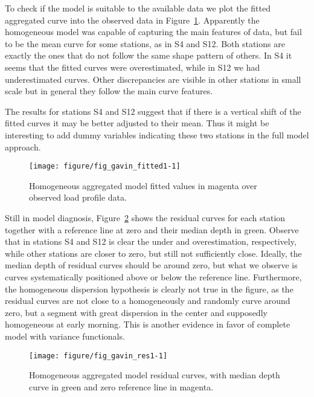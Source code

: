 To check if the model is suitable to the available data we plot the fitted aggregated curve into the observed data in Figure~\ref{fig:gavin-fitted1}. Apparently the homogeneous model was capable of capturing the main features of data, but fail to be the mean curve for some stations, as in S4 and S12. Both stations are exactly the ones that do not follow the same shape pattern of others. In S4 it seems that the fitted curves were overestimated, while in S12 we had underestimated curves. Other discrepancies are visible in other stations in small scale but in general they follow the main curve features.

The results for stations S4 and S12 suggest that if there is a vertical shift of the fitted curves it may be better adjusted to their mean. Thus it might be interesting to add dummy variables indicating these two stations in the full model approach. 



\begin{figure}[t!]
  \centering
\begin{knitrout}
\color{fgcolor}
\texttt{[image: figure/fig\_gavin\_fitted1-1]} 

\end{knitrout}
  \caption{Homogeneous aggregated model fitted values in magenta over observed load profile data.}
  \label{fig:gavin-fitted1}
\end{figure}


Still in model diagnosis, Figure~\ref{fig:gavin-res1} shows the residual curves for each station together with a reference line at zero and their median depth in green. Observe that in stations S4 and S12 is clear the under and overestimation, respectively, while other stations are closer to zero, but still not sufficiently close. Ideally, the median depth of residual curves should be around zero, but what we observe is curves systematically positioned above or below the reference line. Furthermore, the homogeneous dispersion hypothesis is clearly not true in the figure, as the residual curves are not close to a homogeneously and randomly curve around zero, but a segment with great dispersion in the center and supposedly homogeneous at early morning. This is another evidence in favor of complete model with variance functionals. 



\begin{figure}[t]
  \centering
\begin{knitrout}
\color{fgcolor}
\texttt{[image: figure/fig\_gavin\_res1-1]} 

\end{knitrout}
  \caption{Homogeneous aggregated model residual curves, with median depth curve in green and zero reference line in magenta.}
  \label{fig:gavin-res1}
\end{figure}


